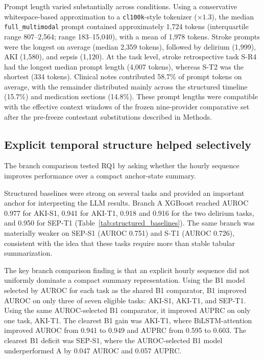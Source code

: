 \documentclass[pdflatex,sn-nature]{sn-jnl}
\begin{document}
Prompt length varied substantially across conditions. Using a conservative whitespace-based approximation to a \texttt{cl100k}-style tokenizer ($\times 1.3$), the median \texttt{full\_multimodal} prompt contained approximately 1,724 tokens (interquartile range 807--2,564; range 183--15,040), with a mean of 1,978 tokens. Stroke prompts were the longest on average (median 2,359 tokens), followed by delirium (1,999), AKI (1,580), and sepsis (1,120). At the task level, stroke retrospective task S-R4 had the longest median prompt length (4,007 tokens), whereas S-T2 was the shortest (334 tokens). Clinical notes contributed 58.7\% of prompt tokens on average, with the remainder distributed mainly across the structured timeline (15.7\%) and medication sections (14.8\%). These prompt lengths were compatible with the effective context windows of the frozen nine-provider comparative set after the pre-freeze contestant substitutions described in Methods.



\addtocounter{table}{-1}
\begingroup
\renewcommand{\theHtable}{table.panelb}

\endgroup

\FloatBarrier

\subsection{Explicit temporal structure helped selectively}

The branch comparison tested RQ1 by asking whether the hourly sequence improves performance over a compact anchor-state summary.

Structured baselines were strong on several tasks and provided an important anchor for interpreting the LLM results. Branch A XGBoost reached AUROC 0.977 for AKI-S1, 0.941 for AKI-T1, 0.918 and 0.916 for the two delirium tasks, and 0.950 for SEP-T1 (Table~\ref{tab:structured_baselines}). The same branch was materially weaker on SEP-S1 (AUROC 0.751) and S-T1 (AUROC 0.726), consistent with the idea that these tasks require more than stable tabular summarization.

The key branch comparison finding is that an explicit hourly sequence did not uniformly dominate a compact summary representation. Using the B1 model selected by AUROC for each task as the shared B1 comparator, B1 improved AUROC on only three of seven eligible tasks: AKI-S1, AKI-T1, and SEP-T1. Using the same AUROC-selected B1 comparator, it improved AUPRC on only one task, AKI-T1. The clearest B1 gain was AKI-T1, where BiLSTM-attention improved AUROC from 0.941 to 0.949 and AUPRC from 0.595 to 0.603. The clearest B1 deficit was SEP-S1, where the AUROC-selected B1 model underperformed A by 0.047 AUROC and 0.057 AUPRC.
\end{document}
